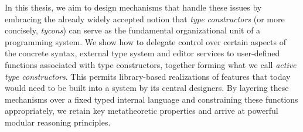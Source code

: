 In this thesis, we aim to design mechanisms that handle these issues by embracing the already widely accepted notion that \emph{type constructors} (or more concisely, \emph{tycons}) can serve as the fundamental organizational unit of a programming system. We show how to delegate control over certain aspects of the concrete syntax, external type system and editor services to user-defined functions associated with type constructors, together forming what we call \emph{active type constructors}. This permits library-based realizations of features that today would need to be built into a system by its central designers. By layering these mechanisms over a fixed typed internal language and constraining these functions appropriately, we retain key  metatheoretic properties and arrive at powerful modular reasoning principles. %

